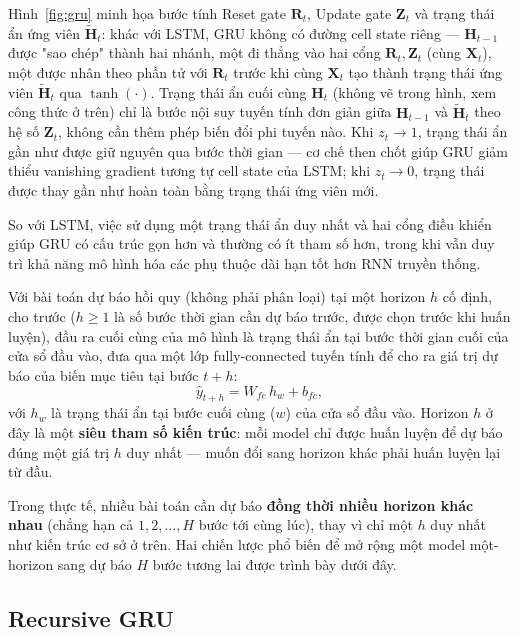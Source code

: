 \documentclass[12pt,oneside]{report}
\begin{document}
Hình~\ref{fig:gru} minh họa bước tính Reset gate $\mathbf{R}_t$, Update gate $\mathbf{Z}_t$ và trạng thái ẩn ứng viên $\tilde{\mathbf{H}}_t$: khác với LSTM, GRU không có đường cell state riêng — $\mathbf{H}_{t-1}$ được "sao chép" thành hai nhánh, một đi thẳng vào hai cổng $\mathbf{R}_t, \mathbf{Z}_t$ (cùng $\mathbf{X}_t$), một được nhân theo phần tử với $\mathbf{R}_t$ trước khi cùng $\mathbf{X}_t$ tạo thành trạng thái ứng viên $\tilde{\mathbf{H}}_t$ qua $\tanh(\cdot)$. Trạng thái ẩn cuối cùng $\mathbf{H}_t$ (không vẽ trong hình, xem công thức ở trên) chỉ là bước nội suy tuyến tính đơn giản giữa $\mathbf{H}_{t-1}$ và $\tilde{\mathbf{H}}_t$ theo hệ số $\mathbf{Z}_t$, không cần thêm phép biến đổi phi tuyến nào. Khi $z_t \to 1$, trạng thái ẩn gần như được giữ nguyên qua bước thời gian — cơ chế then chốt giúp GRU giảm thiểu vanishing gradient tương tự cell state của LSTM; khi $z_t \to 0$, trạng thái được thay gần như hoàn toàn bằng trạng thái ứng viên mới.

So với LSTM, việc sử dụng một trạng thái ẩn duy nhất và hai cổng điều khiển giúp GRU có cấu trúc gọn hơn và thường có ít tham số hơn, trong khi vẫn duy trì khả năng mô hình hóa các phụ thuộc dài hạn tốt hơn RNN truyền thống.

Với bài toán dự báo hồi quy (không phải phân loại) tại một horizon $h$ cố định, cho trước ($h \geq 1$ là số bước thời gian cần dự báo trước, được chọn trước khi huấn luyện), đầu ra cuối cùng của mô hình là trạng thái ẩn tại bước thời gian cuối của cửa sổ đầu vào, đưa qua một lớp fully-connected tuyến tính để cho ra giá trị dự báo của biến mục tiêu tại bước $t+h$:
\begin{equation}
\hat{y}_{t+h} = W_{fc}\, h_{w} + b_{fc},
\end{equation}
với $h_w$ là trạng thái ẩn tại bước cuối cùng ($w$) của cửa sổ đầu vào. Horizon $h$ ở đây là một \textbf{siêu tham số kiến trúc}: mỗi model chỉ được huấn luyện để dự báo đúng một giá trị $h$ duy nhất — muốn đổi sang horizon khác phải huấn luyện lại từ đầu.

Trong thực tế, nhiều bài toán cần dự báo \textbf{đồng thời nhiều horizon khác nhau} (chẳng hạn cả $1, 2, \dots, H$ bước tới cùng lúc), thay vì chỉ một $h$ duy nhất như kiến trúc cơ sở ở trên. Hai chiến lược phổ biến để mở rộng một model một-horizon sang dự báo $H$ bước tương lai được trình bày dưới đây.

\subsection*{Recursive GRU}
\end{document}
